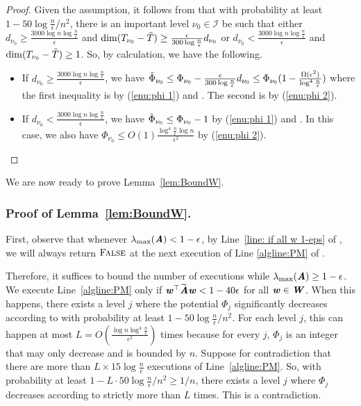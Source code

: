 \begin{proof}
	Given the assumption, it follows from  that with probability at least $1-50\log\frac{n}{\epsilon}/n^{2}$, there is an important level $\nu_{0}\in\mathcal{I}$ be such that either $d_{\nu_{0}}\geq\frac{3000\log n\log\frac{n}{\epsilon}}{\epsilon}$ and $\dimm(T_{\nu_{0}}-\tilde{T})\geq\frac{\epsilon}{300\log\frac{n}{\epsilon}}d_{\nu_{0}}$ or $d_{\nu_{0}}<\frac{3000\log n\log\frac{n}{\epsilon}}{\epsilon}$ and $\dimm(T_{\nu_{0}}-\tilde{T})\geq1$. So, by calculation, we have the following.
	\begin{itemize}
		\item If $d_{\nu_{0}}\geq\frac{3000\log n\log\frac{n}{\epsilon}}{\epsilon}$, we have $\Phitil_{\nu_{0}}\leq\Phi_{\nu_{0}}-\frac{\epsilon}{300\log\frac{n}{\epsilon}}d_{\nu_{0}}\le\Phi_{\nu_{0}}(1-\frac{\Omega(\epsilon^{2})}{\log^{4}\frac{n}{\epsilon}})$ where the first inequality is by (\ref{enu:phi 1}) and . The second is by (\ref{enu:phi 2}). 
		\item If $d_{\nu_{0}}<\frac{3000\log n\log\frac{n}{\epsilon}}{\epsilon}$, we have $\Phitil_{\nu_{0}}\le\Phi_{\nu_{0}}-1$ by (\ref{enu:phi 1}) and . In this case, we also have $\Phi_{\nu_{0}}\leq O(1)\frac{\log^{4}\frac{n}{\epsilon}\log n}{\epsilon^{2}}$ by (\ref{enu:phi 2}). 
	\end{itemize}
\end{proof}
We are now ready to prove Lemma~\ref{lem:BoundW}. 

\subsubsection*{Proof of Lemma~\ref{lem:BoundW}.}

First, observe that whenever $\lambda_{\max}(\AA)<1-\epsilon$, by Line~\ref{line: if all w 1-eps} of , we will always return $\textsc{False}$ at the next execution of Line \ref{algline:PM} of .

Therefore, it suffices to bound the number of executions while $\lambda_{\max}(\AA)\ge1-\epsilon$. We execute Line~\ref{algline:PM} only if $\ww^{\top}\AAtil\ww<1-40\epsilon$ for all $\ww\in\WW$. When this happens, there exists a level $j$ where the potential $\Phi_{j}$ significantly decreases according to  with probability at least $1-50\log\frac{n}{\epsilon}/n^{2}$. For each level $j$, this can happen at most $L=O(\frac{\log n\log^{4}\frac{n}{\epsilon}}{\epsilon^{2}})$ times because for every $j$, $\Phi_{j}$ is an integer that may only decrease and is bounded by $n$. Suppose for contradiction that there are more than $L\times15\log\frac{n}{\epsilon}$ executions of Line~\ref{algline:PM}. So, with probability at least $1-L\cdot50\log\frac{n}{\epsilon}/n^{2}\ge1/n$, there exists a level $j$ where $\Phi_{j}$ decreases according to  strictly more than $L$ times. This is a contradiction. 











